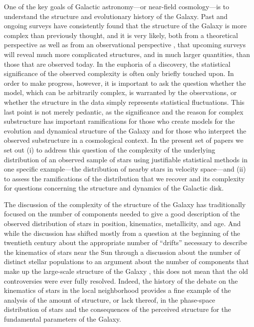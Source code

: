 One of the key goals of Galactic astronomy---or near-field
cosmology---is to understand the structure and evolutionary history of
the Galaxy. Past and ongoing surveys have consistently found that the
structure of the Galaxy is more complex than previously thought, and
it is very likely, both from a theoretical perspective
\citep{ghigna98a,johnston98a,2003MNRAS.339..834H} as well as from an
observational perspective
\citep[\eg,][]{koposov,Koposov:2009ru,2008ApJ...688..277T,2007ApJ...670..313S},
that upcoming surveys will reveal much more complicated structures,
and in much larger quantities, than those that are observed today. In
the euphoria of a discovery, the statistical significance of the
observed complexity is often only briefly touched upon. In order to
make progress, however, it is important to ask the question whether
the model, which can be arbitrarily complex, is warranted by the
observations, or whether the structure in the data simply represents
statistical fluctuations. This last point is not merely pedantic, as
the significance and the reason for complex substructure has important
ramifications for those who create models for the evolution and
dynamical structure of the Galaxy and for those who interpret the
observed substructure in a cosmological context.  In the present set
of papers we set out (i) to address this question of the complexity of
the underlying distribution of an observed sample of stars using
justifiable statistical methods in one specific example---the
distribution of nearby stars in velocity space---and (ii) to assess the
ramifications of the distribution that we recover and its complexity
for questions concerning the structure and dynamics of the Galactic
disk.

The discussion of the complexity of the structure of the Galaxy has
traditionally focused on the number of components needed to give a
good description of the observed distribution of stars in position,
kinematics, metallicity, and age. And while the discussion has shifted
mostly from a question at the beginning of the twentieth century about
the appropriate number of ``drifts'' necessary to describe the
kinematics of stars near the Sun \citep[see
below;][]{kapteyn05a,schwarzschild07a} through a discussion about the
number of distinct stellar populations
\citep{1944ApJ...100..137B,baade1958a,1954AJ.....59..307R,oort58a,schwarzschild58a}
to an argument about the number of components that make up the
large-scale structure of the Galaxy \citep[in particular, the
existence and properties of the ``thick
disk'';][]{1983MNRAS.202.1025G,1980ApJS...44...73B,1984ApJS...55...67B,2008ApJ...684..287I},
this does not mean that the old controversies were ever fully
resolved. Indeed, the history of the debate on the kinematics of stars
in the local neighborhood provides a fine example of the analysis of
the amount of structure, or lack thereof, in the phase-space
distribution of stars and the consequences of the perceived structure
for the fundamental parameters of the Galaxy.

